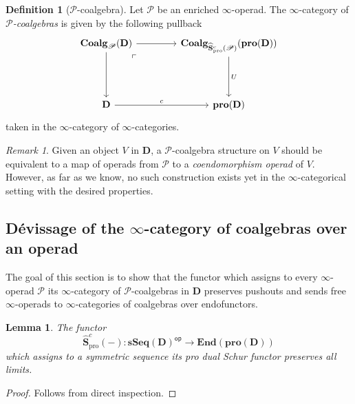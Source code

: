 \documentclass{proc-l}
\theoremstyle{plain}
\newtheorem{lemma}[{theorem}]{Lemma}
\theoremstyle{definition}
\newtheorem{definition}[{theorem}]{Definition}
\theoremstyle{remark}
\newtheorem{remark}[{theorem}]{Remark}
\begin{document}
\begin{definition}[{$\mathscr{P}$-coalgebra}]%
\label{Definition:3.11}\label{def: infinity categorical P-coalgebras}
Let $\mathscr{P}$ be an enriched $\infty$-operad. The $\infty$-category of $\mathscr{P}$\textit{-coalgebras} is given by the following pullback
\[
\begin{tikzcd}[column sep=3.5pc,row sep=3.5pc]
\mathbf{Coalg}_\mathscr{P}(\mathbf{D}) \arrow[r] \arrow[d] \arrow[dr, phantom, "\ulcorner", very near start]
&\mathbf{Coalg}_{\widehat{\mathbf{S}}^c_{\mathrm{pro}}(\mathscr{P})}(\mathbf{pro}(\mathbf{D})) \arrow[d,"U"]\\
\mathbf{D} \arrow[r,"c"]
&\mathbf{pro}(\mathbf{D})
\end{tikzcd}
\]
taken in the $\infty$-category of $\infty$-categories.
\end{definition}

\begin{remark}%
\label{Remark:3.12}Given an object $V$ in $\mathbf{D}$, a $\mathscr{P}$-coalgebra structure on $V$ should be equivalent to a map of operads from $\mathscr{P}$ to a \textit{coendomorphism operad} of $V$. However, as far as we know, no such construction exists yet in the $\infty$-categorical setting with the desired properties.
\end{remark}

\subsection{D{\'{e}}vissage of the $\infty$-category of coalgebras over an operad}%
\label{Section:3.3}
The goal of this section is to show that the functor which assigns to every $\infty$-operad $\mathscr{P}$ its $\infty$-category of $\mathscr{P}$-coalgebras in $\mathbf{D}$ preserves pushouts and sends free $\infty$-operads to $\infty$-categories of coalgebras over endofunctors.

\begin{lemma}%
\label{Lemma:3.13}\label{lemma: pro-Schur functor preserves limits}
The functor
\[
\widehat{\mathbf{S}}^c_{\mathrm{pro}}(-): \mathbf{sSeq}(\mathbf{D})^{\mathsf{op}} \longrightarrow \mathbf{End}(\mathbf{pro}(\mathbf{D}))
\]
which assigns to a symmetric sequence its pro dual Schur functor preserves all limits.
\end{lemma}

\begin{proof}
Follows from direct inspection.
\end{proof}
\end{document}
